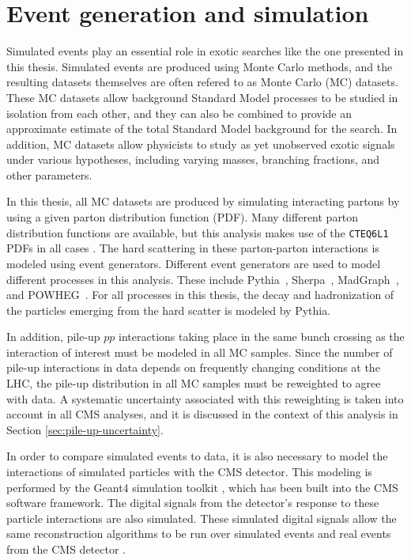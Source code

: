 \section{Event generation and simulation}
\label{sec:reco-gen}

Simulated events play an essential role in exotic searches
like the one presented in this thesis.  Simulated events 
are produced using Monte Carlo methods, and the resulting 
datasets themselves are often refered to as Monte Carlo (MC) datasets.
These MC datasets allow background Standard Model processes
to be studied in isolation from each other, and they can 
also be combined to provide an approximate estimate of the total 
Standard Model background for the search.  In addition, 
MC datasets allow physicists to study as yet unobserved exotic
signals under various hypotheses, including varying masses, branching
fractions, and other parameters.

In this thesis, all MC datasets are produced by simulating
interacting partons by using a given parton distribution function
(PDF).  Many different parton distribution functions are available,
but this analysis makes use of the {\tt CTEQ6L1} PDFs in all cases
\cite{cteq}.  The hard scattering in these parton-parton interactions is modeled using
event generators.  Different event generators are used to model
different processes in this analysis.  These include
{\sc Pythia}~\cite{pythia},
{\sc Sherpa}~\cite{sherpa},
{\sc MadGraph}~\cite{madgraph-1,madgraph-2}, and 
{\sc POWHEG}~\cite{powheg-st,powheg-w,powheg-1,powheg-2,powheg-3}.  
For all processes in this thesis, the decay and hadronization of the particles
emerging from the hard scatter is modeled by {\sc Pythia}.

In addition, pile-up $pp$ interactions taking place in the same
bunch crossing as the interaction of interest must be modeled in all MC samples.  
Since the number of pile-up interactions in data depends on 
frequently changing conditions at the LHC, the pile-up distribution in all MC samples
must be reweighted to agree with data.  A systematic uncertainty associated with this
reweighting is taken into account in all CMS analyses, and it is discussed in the 
context of this analysis in Section \ref{sec:pile-up-uncertainty}.

In order to compare simulated events to data,
it is also necessary to model the interactions of simulated particles with the CMS detector.
This modeling is performed by the {\sc Geant4} simulation toolkit \cite{geant},
which has been built into the CMS software framework.
The digital signals from the detector's response to these particle 
interactions are also simulated.  These simulated digital signals allow the same 
reconstruction algorithms to be run over simulated events and real events
from the CMS detector \cite{cms-tdr,cms-jinst}.
